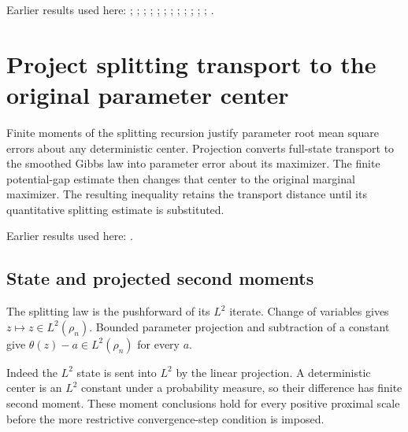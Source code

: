 \documentclass[11pt,a4paper]{report}
\begin{document}
Earlier results used here: \cite[Section~3.17.3]{LangevinLean2026ULASC}; \cite[Section~3.17.4]{LangevinLean2026ULASC}; \cite[Section~3.21.2]{LangevinLean2026ULASC}; \cite[Section~3.26.13]{LangevinLean2026ULASC}; \cite[Section~3.26.15]{LangevinLean2026ULASC}; \cite[Section~3.26.3]{LangevinLean2026ULASC}; \cite[Section~3.33.9]{LangevinLean2026ULASC}; \cite[Section~3.1.1]{LangevinLean2026IPLA}; \cite[Section~3.1.3]{LangevinLean2026IPLA}; \cite[Section~3.1.4]{LangevinLean2026IPLA}; \cite[Section~3.3.2]{LangevinLean2026IPLA}; \cite[Section~3.5.1]{LangevinLean2026IPLA}; \cite[Section~3.7.1]{LangevinLean2026IPLA}.
\section{\texorpdfstring{Project splitting transport to the original parameter center}{Project splitting transport to the original parameter center}}
\label{proof-module-ProximalLangevin-SplittingProjection-lean}


Finite moments of the splitting recursion justify parameter root mean square errors about any deterministic center. Projection converts full-state transport to the smoothed Gibbs law into parameter error about its maximizer. The finite potential-gap estimate then changes that center to the original marginal maximizer. The resulting inequality retains the transport distance until its quantitative splitting estimate is substituted.




Earlier results used here: \cite[Section~3.21]{LangevinLean2026ULASC}.
\subsection{\texorpdfstring{State and projected second moments}{State and projected second moments}}
\label{report-step-ProximalLangevin-SplittingProjection-lean-1}


The splitting law is the pushforward of its \(L^2\) iterate. Change of variables gives \(z\mapsto z\in L^2(\rho_n)\). Bounded parameter projection and subtraction of a constant give \(\theta(z)-a\in L^2(\rho_n)\) for every \(a\).



Indeed the \(L^2\) state is sent into \(L^2\) by the linear projection. A deterministic center is an \(L^2\) constant under a probability measure, so their difference has finite second moment. These moment conclusions hold for every positive proximal scale before the more restrictive convergence-step condition is imposed.
\end{document}
